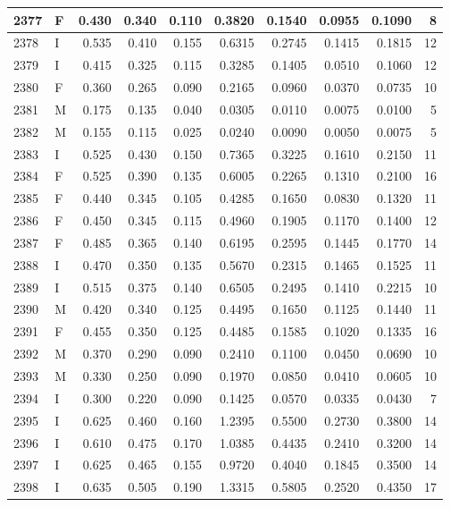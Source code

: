 \documentclass[9pt,twocolumn,twoside,]{pnas-new}
\begin{document}
\begin{tabular}{l|l|r|r|r|r|r|r|r|r}
\hline
2377 & F & 0.430 & 0.340 & 0.110 & 0.3820 & 0.1540 & 0.0955 & 0.1090 & 8\\
\hline
2378 & I & 0.535 & 0.410 & 0.155 & 0.6315 & 0.2745 & 0.1415 & 0.1815 & 12\\
\hline
2379 & I & 0.415 & 0.325 & 0.115 & 0.3285 & 0.1405 & 0.0510 & 0.1060 & 12\\
\hline
2380 & F & 0.360 & 0.265 & 0.090 & 0.2165 & 0.0960 & 0.0370 & 0.0735 & 10\\
\hline
2381 & M & 0.175 & 0.135 & 0.040 & 0.0305 & 0.0110 & 0.0075 & 0.0100 & 5\\
\hline
2382 & M & 0.155 & 0.115 & 0.025 & 0.0240 & 0.0090 & 0.0050 & 0.0075 & 5\\
\hline
2383 & I & 0.525 & 0.430 & 0.150 & 0.7365 & 0.3225 & 0.1610 & 0.2150 & 11\\
\hline
2384 & F & 0.525 & 0.390 & 0.135 & 0.6005 & 0.2265 & 0.1310 & 0.2100 & 16\\
\hline
2385 & F & 0.440 & 0.345 & 0.105 & 0.4285 & 0.1650 & 0.0830 & 0.1320 & 11\\
\hline
2386 & F & 0.450 & 0.345 & 0.115 & 0.4960 & 0.1905 & 0.1170 & 0.1400 & 12\\
\hline
2387 & F & 0.485 & 0.365 & 0.140 & 0.6195 & 0.2595 & 0.1445 & 0.1770 & 14\\
\hline
2388 & I & 0.470 & 0.350 & 0.135 & 0.5670 & 0.2315 & 0.1465 & 0.1525 & 11\\
\hline
2389 & I & 0.515 & 0.375 & 0.140 & 0.6505 & 0.2495 & 0.1410 & 0.2215 & 10\\
\hline
2390 & M & 0.420 & 0.340 & 0.125 & 0.4495 & 0.1650 & 0.1125 & 0.1440 & 11\\
\hline
2391 & F & 0.455 & 0.350 & 0.125 & 0.4485 & 0.1585 & 0.1020 & 0.1335 & 16\\
\hline
2392 & M & 0.370 & 0.290 & 0.090 & 0.2410 & 0.1100 & 0.0450 & 0.0690 & 10\\
\hline
2393 & M & 0.330 & 0.250 & 0.090 & 0.1970 & 0.0850 & 0.0410 & 0.0605 & 10\\
\hline
2394 & I & 0.300 & 0.220 & 0.090 & 0.1425 & 0.0570 & 0.0335 & 0.0430 & 7\\
\hline
2395 & I & 0.625 & 0.460 & 0.160 & 1.2395 & 0.5500 & 0.2730 & 0.3800 & 14\\
\hline
2396 & I & 0.610 & 0.475 & 0.170 & 1.0385 & 0.4435 & 0.2410 & 0.3200 & 14\\
\hline
2397 & I & 0.625 & 0.465 & 0.155 & 0.9720 & 0.4040 & 0.1845 & 0.3500 & 14\\
\hline
2398 & I & 0.635 & 0.505 & 0.190 & 1.3315 & 0.5805 & 0.2520 & 0.4350 & 17\\

\end{tabular}
\end{document}
